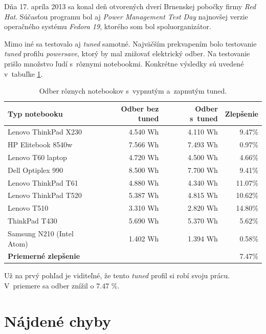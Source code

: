 Dňa 17. apríla 2013 sa konal deň otvorených dverí Brnenskej pobočky firmy
\emph{Red Hat}. Súčasťou programu bol aj \emph{Power Management Test Day}
najnovšej verzie operačného systému \emph{Fedora 19}, ktorého som bol
spoluorganizátor. 

Mimo iné sa testovalo aj \emph{tuned} samotné. Najväčším prekvapením bolo
testovanie \emph{tuned} profilu \emph{powersave}, ktorý by mal znižovať
elektrický odber. Na testovanie prišlo množstvo ľudí s~rôznymi notebookmi.
Konkrétne výsledky sú uvedené v~tabuľke \ref{tab:testday-results}.

\begin{table}[H]
\begin{center}
\begin{tabular}{|l|r|r|r|}
    \hline
    \textbf{Typ notebooku} & \textbf{Odber bez tuned} & \textbf{Odber s~tuned} & \textbf{Zlepšenie} \\
    \hline
    Lenovo ThinkPad X230        & 4.540 Wh & 4.110 Wh & 9.47\% \\
    HP Elitebook 8540w          & 7.566 Wh & 7.493 Wh & 0.97\% \\
    Lenovo T60 laptop           & 4.720 Wh & 4.500 Wh & 4.66\% \\
    Dell Optiplex 990           & 8.500 Wh & 7.700 Wh & 9.41\% \\
    Lenovo ThinkPad T61         & 4.880 Wh & 4.340 Wh & 11.07\% \\
    Lenovo ThinkPad T520        & 5.387 Wh & 4.815 Wh & 10.62\% \\
    Lenovo T510                 & 3.310 Wh & 2.820 Wh & 14.80\% \\
    ThinkPad T430               & 5.690 Wh & 5.370 Wh & 5.62\% \\
    Samsung N210 (Intel Atom)   & 1.402 Wh & 1.394 Wh & 0.58\% \\
    \hline
    \textbf{Priemerné zlepšenie} & \multicolumn{3}{|r|}{7.47\%} \\
    \hline
\end{tabular}
\caption{Odber rôznych notebookov s~vypnutým a~zapnutým tuned.}
\label{tab:testday-results}
\end{center}
\end{table}

Už na prvý pohľad je viditeľné, že tento \emph{tuned} profil si robí svoju
prácu. V~priemere sa odber znížil o 7.47 \%. 

%
%

\section{Nájdené chyby}

